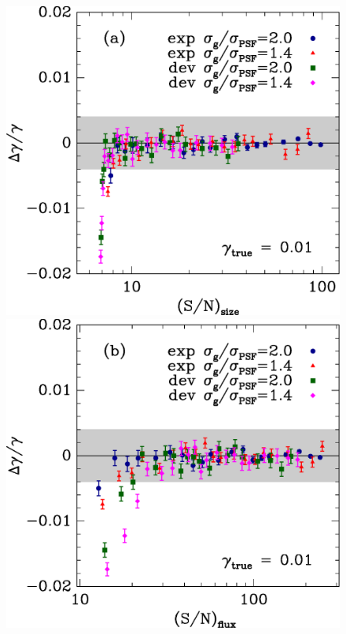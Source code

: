\documentclass[12pt,preprint]{aastex}
\begin{document}
\begin{figure}[p] \centering
 \centering 
 \includegraphics[scale=0.45]{figures/cbafit-geg-T-s2n.eps}
 \includegraphics[scale=0.45]{figures/cbafit-geg-flux-s2n.eps}


\end{figure}
\end{document}
